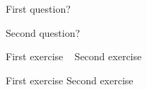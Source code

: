 \begin{activity}
\begin{ctqs}

	\question First question?
		\begin{solution}[1in]{}
		\end{solution}
	
	\question Second question?
		\begin{solution}[1in]{}
		\end{solution}
\end{ctqs}



\begin{exercises}

	\exercise First exercise ~
	\exercise Second exercise
	
\end{exercises}


\begin{problems}

	\problem First exercise
	\problem Second exercise
	
\end{problems}


	
\end{activity}